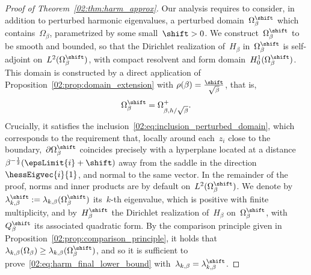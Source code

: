 \begin{proof}[Proof of Theorem~\ref{02:thm:harm_approx}]
        Our analysis requires to consider, in addition to perturbed harmonic eigenvalues, a perturbed domain~$\Omega_\beta^\shift$ which contains~$\Omega_\beta$, parametrized by some small~$\shift>0$.
        We construct~$\Omega_\beta^\shift$ to be smooth and bounded, so that the Dirichlet realization of~$H_\beta$ in~$\Omega_\beta^\shift$ is self-adjoint on~$L^2(\Omega_\beta^\shift)$, with compact resolvent and form domain~$H_0^1(\Omega_\beta^\shift)$.
        This domain is constructed by a direct application of Proposition~\ref{02:prop:domain_extension} with $\rho(\beta)=\frac{\shift}{\sqrt\beta}$, that is, $$\Omega_\beta^\shift = \Omega_{\beta,h/\sqrt\beta}^{+}.$$ Crucially, it satisfies the inclusion~\eqref{02:eq:inclusion_perturbed_domain}, which corresponds to the requirement that, locally around each~$z_i$ close to the boundary,~$\partial\Omega_\beta^\shift$ coincides precisely with a hyperplane located at a distance~$\beta^{-\frac12}(\epsLimit{i}+\shift)$ away from the saddle in the direction~$\hessEigvec{i}{1}$, and normal to the same vector.
        In the remainder of the proof, norms and inner products are by default on~$L^2(\Omega_\beta^\shift)$.
        We denote by~$\lambda^\shift_{k,\beta}:=\lambda_{k,\beta}(\Omega_\beta^\shift)$ its~$k$-th eigenvalue, which is positive with finite multiplicity, and by~$H_\beta^\shift$ the Dirichlet realization of~$H_\beta$ on~$\Omega_\beta^\shift$, with~$Q_\beta^\shift$ its associated quadratic form.
        By the comparison principle given in Proposition~\ref{02:prop:comparison_principle}, it holds that $\lambda_{k,\beta}(\Omega_\beta)\geq \lambda_{k,\beta}(\Omega_\beta^\shift)$, and so it is sufficient to prove~\eqref{02:eq:harm_final_lower_bound} with~$\lambda_{k,\beta}=\lambda_{k,\beta}^\shift$.
        \medskip


\end{proof}
